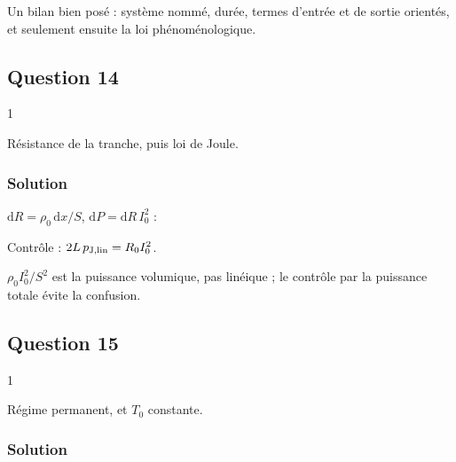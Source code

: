\documentclass[11pt,a4paper]{article}
\newcommand{\equationajustee}[1]{%
  \sbox{\boiteequation}{$\displaystyle #1$}%
  \ifdim\wd\boiteequation>\linewidth
    \[\resizebox{\linewidth}{!}{\usebox{\boiteequation}}\]%
  \else
    \[#1\]%
  \fi}
\begin{document}
\begin{methode}

Un bilan bien posé : système nommé, durée, termes d'entrée et de sortie orientés, et seulement ensuite la loi phénoménologique.

\end{methode}

\hypertarget{question-14}{%
\subsection{Question 14}\label{question-14}}

\begin{indication}{1}

Résistance de la tranche, puis loi de Joule.

\end{indication}

\hypertarget{solution-13}{%
\subsubsection{Solution}\label{solution-13}}

\(\mathrm dR=\rho_0\,\mathrm dx/S\), \(\mathrm dP=\mathrm dR\,I_0^2\) :

\equationajustee{\boxed{p_{\rm J,lin}=\frac{\rho_0I_0^2}{S}}}

Contrôle : \(2L\,p_{\rm J,lin}=R_0I_0^2\).

\begin{piege}

\(\rho_0I_0^2/S^2\) est la puissance volumique, pas linéique ; le contrôle par la puissance totale évite la confusion.

\end{piege}

\hypertarget{question-15}{%
\subsection{Question 15}\label{question-15}}

\begin{indication}{1}

Régime permanent, et \(T_0\) constante.

\end{indication}

\hypertarget{solution-14}{%
\subsubsection{Solution}\label{solution-14}}
\end{document}
